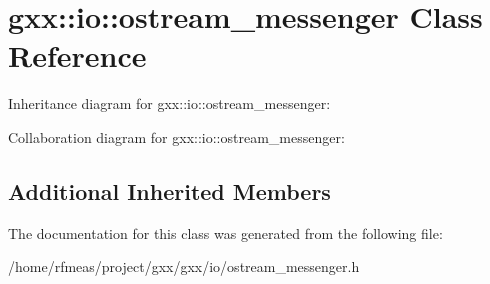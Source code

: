 \hypertarget{classgxx_1_1io_1_1ostream__messenger}{}\section{gxx\+:\+:io\+:\+:ostream\+\_\+messenger Class Reference}
\label{classgxx_1_1io_1_1ostream__messenger}


Inheritance diagram for gxx\+:\+:io\+:\+:ostream\+\_\+messenger\+:


Collaboration diagram for gxx\+:\+:io\+:\+:ostream\+\_\+messenger\+:
\subsection*{Additional Inherited Members}


The documentation for this class was generated from the following file\+:\begin{DoxyCompactItemize}
\item 
/home/rfmeas/project/gxx/gxx/io/ostream\+\_\+messenger.\+h\end{DoxyCompactItemize}
